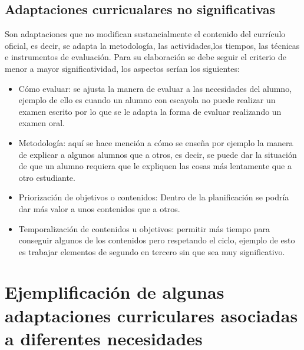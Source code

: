 \subsection{Adaptaciones curricualares no significativas}
Son adaptaciones que no modifican sustancialmente  el contenido del currículo oficial, es decir, se adapta la metodología,  las actividades,los tiempos, las técnicas e instrumentos de evaluación. Para su elaboración se debe  seguir el criterio de menor a mayor significatividad, los aspectos serían los siguientes:
\begin{itemize}
    \item Cómo evaluar: se ajusta la manera de evaluar a las necesidades del alumno, ejemplo de ello es cuando un alumno con escayola no puede realizar un examen escrito por lo que se le adapta la forma de evaluar realizando un examen oral.
    \item Metodología: aquí se hace mención a cómo se enseña por ejemplo la manera de explicar a algunos alumnos que a otros, es decir, se puede dar la situación de que un alumno requiera que le expliquen las cosas más lentamente que a otro estudiante.
    \item Priorización de objetivos o contenidos: Dentro de la planificación se podría dar más valor a unos contenidos que a otros.
    \item Temporalización de contenidos u objetivos: permitir más tiempo para conseguir algunos de los contenidos pero respetando el ciclo, ejemplo de esto es trabajar elementos de segundo en tercero sin que sea muy significativo.
\end{itemize}

\section{Ejemplificación de algunas adaptaciones curriculares asociadas a diferentes necesidades }

